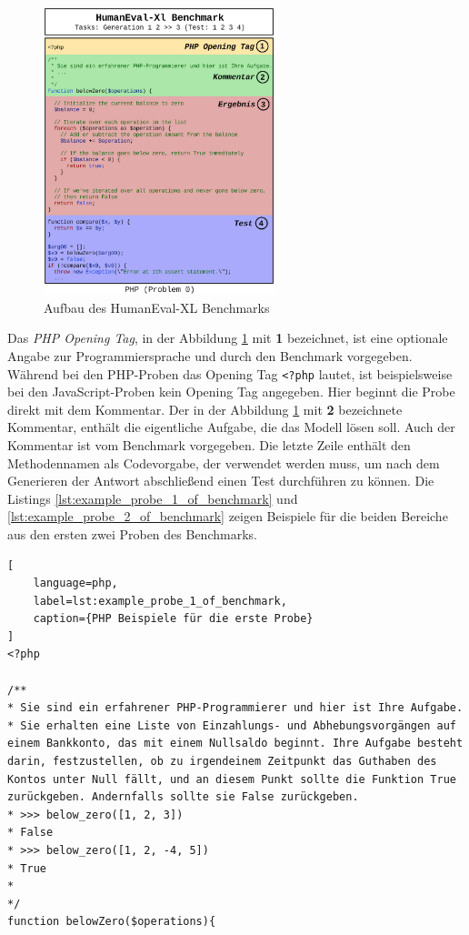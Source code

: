 \begin{figure}[!ht]
	\includegraphics[width=0.6\textwidth]{content/chapter_concept_design/images/code_generation_humaneval_x.eps}
	\centering
	\caption{Aufbau des HumanEval-XL Benchmarks}
	\label{img:code_generation_humaneval}
\end{figure}

Das \textit{PHP Opening Tag}, in der Abbildung \ref{img:code_generation_humaneval} mit \textbf{1} bezeichnet, ist eine optionale Angabe zur Programmiersprache und durch den Benchmark vorgegeben. Während bei den PHP-Proben das Opening Tag \texttt{<?php} lautet, ist beispielsweise bei den JavaScript-Proben kein Opening Tag angegeben. Hier beginnt die Probe direkt mit dem Kommentar. Der in der Abbildung \ref{img:code_generation_humaneval} mit \textbf{2} bezeichnete Kommentar, enthält die eigentliche Aufgabe, die das Modell lösen soll. Auch der Kommentar ist vom Benchmark vorgegeben. Die letzte Zeile enthält den Methodennamen als Codevorgabe, der verwendet werden muss, um nach dem Generieren der Antwort abschließend einen Test durchführen zu können. Die Listings \ref{lst:example_probe_1_of_benchmark} und \ref{lst:example_probe_2_of_benchmark} zeigen Beispiele für die beiden Bereiche aus den ersten zwei Proben des Benchmarks.\vspace{0.2cm}

\begin{lstlisting}[
	language=php,
	label=lst:example_probe_1_of_benchmark,
	caption={PHP Beispiele für die erste Probe}
]
<?php

/**
* Sie sind ein erfahrener PHP-Programmierer und hier ist Ihre Aufgabe.
* Sie erhalten eine Liste von Einzahlungs- und Abhebungsvorgängen auf einem Bankkonto, das mit einem Nullsaldo beginnt. Ihre Aufgabe besteht darin, festzustellen, ob zu irgendeinem Zeitpunkt das Guthaben des Kontos unter Null fällt, und an diesem Punkt sollte die Funktion True zurückgeben. Andernfalls sollte sie False zurückgeben.
* >>> below_zero([1, 2, 3])
* False
* >>> below_zero([1, 2, -4, 5])
* True
*
*/
function belowZero($operations){
\end{lstlisting}

